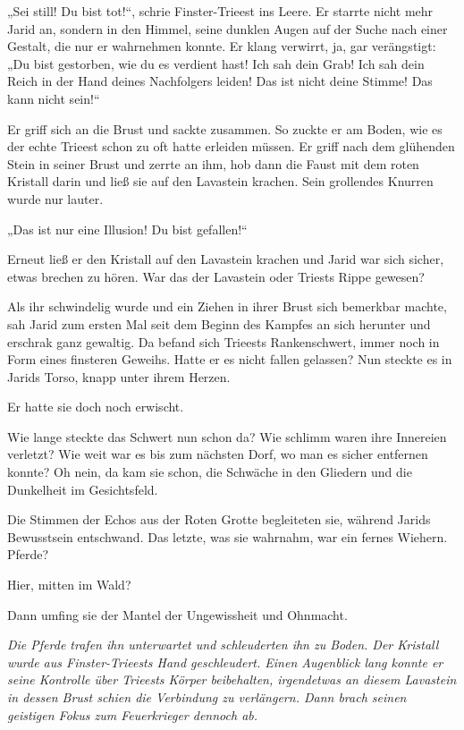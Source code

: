 „Sei still! Du bist tot!“, schrie Finster-Trieest ins Leere. Er starrte nicht mehr Jarid an, sondern in den Himmel, seine dunklen Augen auf der Suche nach einer Gestalt, die nur er wahrnehmen konnte. Er klang verwirrt, ja, gar verängstigt: „Du bist gestorben, wie du es verdient hast! Ich sah dein Grab! Ich sah dein Reich in der Hand deines Nachfolgers leiden! Das ist nicht deine Stimme! Das kann nicht sein!“

Er griff sich an die Brust und sackte zusammen. So zuckte er am Boden, wie es der echte Trieest schon zu oft hatte erleiden müssen. Er griff nach dem glühenden Stein in seiner Brust und zerrte an ihm, hob dann die Faust mit dem roten Kristall darin und ließ sie auf den Lavastein krachen. Sein grollendes Knurren wurde nur lauter.

„Das ist nur eine Illusion! Du bist gefallen!“

Erneut ließ er den Kristall auf den Lavastein krachen und Jarid war sich sicher, etwas brechen zu hören. War das der Lavastein oder Triests Rippe gewesen?

Als ihr schwindelig wurde und ein Ziehen in ihrer Brust sich bemerkbar machte, sah Jarid zum ersten Mal seit dem Beginn des Kampfes an sich herunter und erschrak ganz gewaltig. Da befand sich Trieests Rankenschwert, immer noch in Form eines finsteren Geweihs. Hatte er es nicht fallen gelassen? Nun steckte es in Jarids Torso, knapp unter ihrem Herzen.

Er hatte sie doch noch erwischt.

Wie lange steckte das Schwert nun schon da? Wie schlimm waren ihre Innereien verletzt? Wie weit war es bis zum nächsten Dorf, wo man es sicher entfernen konnte? Oh nein, da kam sie schon, die Schwäche in den Gliedern und die Dunkelheit im Gesichtsfeld.

Die Stimmen der Echos aus der Roten Grotte begleiteten sie, während Jarids Bewusstsein entschwand. Das letzte, was sie wahrnahm, war ein fernes Wiehern. Pferde?

Hier, mitten im Wald?

Dann umfing sie der Mantel der Ungewissheit und Ohnmacht.



\trennzeichen



\textit{Die Pferde trafen ihn unterwartet und schleuderten ihn zu Boden. Der Kristall wurde aus Finster-Trieests Hand geschleudert. Einen Augenblick lang konnte er seine Kontrolle über Trieests Körper beibehalten, irgendetwas an diesem Lavastein in dessen Brust schien die Verbindung zu verlängern. Dann brach seinen geistigen Fokus zum Feuerkrieger dennoch ab.}


